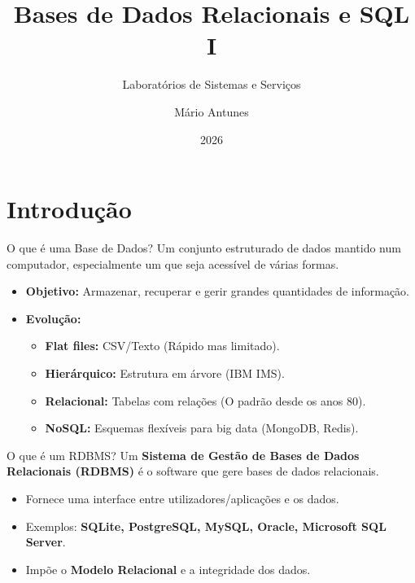 \documentclass[
  ignorenonframetext,
]{beamer}
\title{\texorpdfstring{Bases de Dados Relacionais e SQL
I}{Bases de Dados Relacionais e SQL I}}
\subtitle{\texorpdfstring{Laboratórios de Sistemas e
Serviços}{Laboratórios de Sistemas e Serviços}}
\author{\texorpdfstring{Mário Antunes}{Mário Antunes}}
\date{2026}
\institute{Universidade de Aveiro}
\providecommand{\tightlist}{%
  \setlength{\itemsep}{0pt}\setlength{\parskip}{0pt}}
\begin{document}
\frame{\titlepage}

\section{Introdução}\label{introduuxe7uxe3o}

\begin{frame}{O que é uma Base de Dados?}
\protect{}\label{o-que-uxe9-uma-base-de-dados}
Um conjunto estruturado de dados mantido num computador, especialmente
um que seja acessível de várias formas.

\begin{itemize}
\tightlist
\item
  \textbf{Objetivo:} Armazenar, recuperar e gerir grandes quantidades de
  informação.
\item
  \textbf{Evolução:}

  \begin{itemize}
  \tightlist
  \item
    \textbf{Flat files:} CSV/Texto (Rápido mas limitado).
  \item
    \textbf{Hierárquico:} Estrutura em árvore (IBM IMS).
  \item
    \textbf{Relacional:} Tabelas com relações (O padrão desde os anos
    80).
  \item
    \textbf{NoSQL:} Esquemas flexíveis para big data (MongoDB, Redis).
  \end{itemize}
\end{itemize}
\end{frame}

\begin{frame}{O que é um RDBMS?}
\protect{}\label{o-que-uxe9-um-rdbms}
Um \textbf{Sistema de Gestão de Bases de Dados Relacionais (RDBMS)} é o
software que gere bases de dados relacionais.

\begin{itemize}
\tightlist
\item
  Fornece uma interface entre utilizadores/aplicações e os dados.
\item
  Exemplos: \textbf{SQLite, PostgreSQL, MySQL, Oracle, Microsoft SQL
  Server}.
\item
  Impõe o \textbf{Modelo Relacional} e a integridade dos dados.
\end{itemize}
\end{frame}
\end{document}

